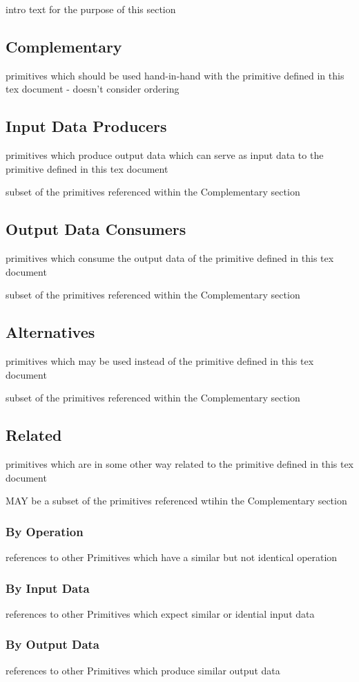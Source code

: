 \documentclass[../../main.tex]{subfiles}
\begin{document}
intro text for the purpose of this section

\subsection{Complementary}

primitives which should be used hand-in-hand with the primitive defined in this tex document - doesn't consider ordering

\subsection{Input Data Producers}

primitives which produce output data which can serve as input data to the primitive defined in this tex document

subset of the primitives referenced within the Complementary section

\subsection{Output Data Consumers}

primitives which consume the output data of the primitive defined in this tex document

subset of the primitives referenced within the Complementary section

\subsection{Alternatives}

primitives which may be used instead of the primitive defined in this tex document

subset of the primitives referenced within the Complementary section

\subsection{Related}

primitives which are in some other way related to the primitive defined in this tex document

MAY be a subset of the primitives referenced wtihin the Complementary section

\subsubsection{By Operation}

references to other Primitives which have a similar but not identical operation

\subsubsection{By Input Data}

references to other Primitives which expect similar or idential input data

\subsubsection{By Output Data}

references to other Primitives which produce similar output data
\end{document}
